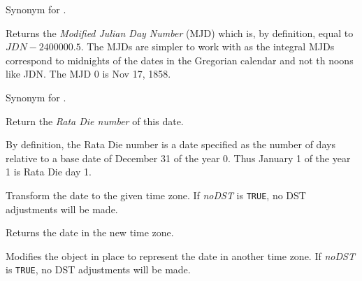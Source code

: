 \label{wxdatetimegetjdn}


Synonym for .

\label{wxdatetimegetmodifiedjuliandaynumber}


Returns the {\it Modified Julian Day Number} (MJD) which is, by definition,
equal to $JDN - 2400000.5$. The MJDs are simpler to work with as the integral
MJDs correspond to midnights of the dates in the Gregorian calendar and not th
noons like JDN. The MJD $0$ is Nov 17, 1858.

\label{wxdatetimegetmjd}


Synonym for .

\label{wxdatetimegetratadie}


Return the {\it Rata Die number} of this date.

By definition, the Rata Die number is a date specified as the number of days
relative to a base date of December 31 of the year 0. Thus January 1 of the
year 1 is Rata Die day 1.


\label{wxdatetimetotimezone}


Transform the date to the given time zone. If {\it noDST} is {\tt TRUE}, no
DST adjustments will be made.

Returns the date in the new time zone.

\label{wxdatetimemaketimezone}


Modifies the object in place to represent the date in another time zone. If 
{\it noDST} is {\tt TRUE}, no DST adjustments will be made.

